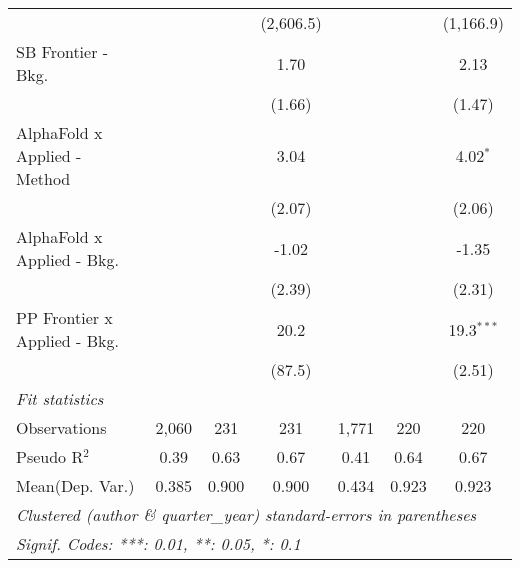 \begin{tabular}{lcccccc}
                                &               &            & (2,606.5)   &               &             & (1,166.9)\\   
   SB Frontier - Bkg.           &               &            & 1.70        &               &             & 2.13\\   
                                &               &            & (1.66)      &               &             & (1.47)\\   
   AlphaFold x Applied - Method &               &            & 3.04        &               &             & 4.02$^{*}$\\   
                                &               &            & (2.07)      &               &             & (2.06)\\   
   AlphaFold x Applied - Bkg.   &               &            & -1.02       &               &             & -1.35\\   
                                &               &            & (2.39)      &               &             & (2.31)\\   
   PP Frontier x Applied - Bkg. &               &            & 20.2        &               &             & 19.3$^{***}$\\   
                                &               &            & (87.5)      &               &             & (2.51)\\   
   \midrule
   \emph{Fit statistics}\\
   Observations                 & 2,060         & 231        & 231         & 1,771         & 220         & 220\\  
   Pseudo R$^2$                 & 0.39          & 0.63       & 0.67        & 0.41          & 0.64        & 0.67\\  
Mean(Dep. Var.) & 0.385 & 0.900 & 0.900 & 0.434 & 0.923 & 0.923 \\
   \midrule \midrule
   \multicolumn{7}{l}{\emph{Clustered (author \& quarter\_year) standard-errors in parentheses}}\\
   \multicolumn{7}{l}{\emph{Signif. Codes: ***: 0.01, **: 0.05, *: 0.1}}\\
\end{tabular}
\par\endgroup
